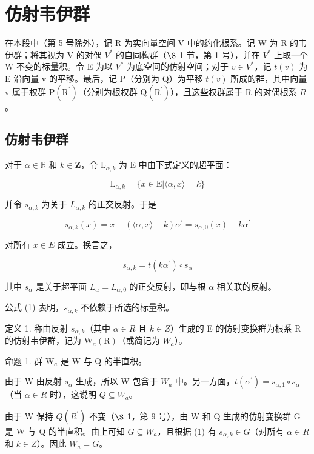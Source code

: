 \section{仿射韦伊群}

在本段中（第 5 号除外），记 R 为实向量空间 V 中的约化根系。记 W 为 R 的韦伊群；将其视为 V 的对偶 \(V^{*}\) 的自同构群（\(\S\) 1 节，第 1 号），并在 \(V^{*}\) 上取一个 W 不变的标量积。令 E 为以 \(V^{*}\) 为底空间的仿射空间；对于 \(v \in V^{*}\)，记 \(t(v)\) 为 E 沿向量 v 的平移。最后，记 P（分别为 Q）为平移 \(t(v)\) 所成的群，其中向量 v 属于权群 \(\mathrm{P}(\mathrm{R}^{\prime})\)（分别为根权群 \(\mathrm{Q}(\mathrm{R}^{\prime})\)），且这些权群属于 R 的对偶根系 \(R^{\prime}\)。

\subsection{仿射韦伊群}

对于 \(\alpha \in \mathbb{R}\) 和 \(k\in \mathbf{Z}\)，令 \(\mathrm{L}_{\alpha ,k}\) 为 E 中由下式定义的超平面：

\[
\mathrm{L} _ {\alpha , k} = \{x \in \mathrm{E} | \langle \alpha , x \rangle = k \}
\]

并令 \(s_{\alpha, k}\) 为关于 \(L_{\alpha, k}\) 的正交反射。于是

\[
s _ {\alpha , k} (x) = x - (\langle \alpha , x \rangle - k) \alpha^ {\prime} = s _ {\alpha , 0} (x) + k \alpha^ {\prime}
\]

对所有 \(x \in E\) 成立。换言之，

\[
s _ {\alpha , k} = t (k \alpha^ {\prime}) \circ s _ {\alpha}\tag{1}
\]

其中 \(s_{\alpha}\) 是关于超平面 \(L_{\alpha} = L_{\alpha,0}\) 的正交反射，即与根 \(\alpha\) 相关联的反射。

公式 (1) 表明，\(s_{\alpha, k}\) 不依赖于所选的标量积。

定义 1. 称由反射 \(s_{\alpha,k}\)（其中 \(\alpha \in R\) 且 \(k \in Z\)）生成的 E 的仿射变换群为根系 R 的仿射韦伊群，记为 \(\mathrm{W}_{a}(\mathrm{R})\)（或简记为 \(W_{a}\)）。

命题 1. 群 \(\mathrm{W}_a\) 是 \(\mathrm{W}\) 与 \(\mathrm{Q}\) 的半直积。

由于 W 由反射 \(s_{\alpha}\) 生成，所以 W 包含于 \(W_{a}\) 中。另一方面，\(t(\alpha^{\prime}) = s_{\alpha,1} \circ s_{\alpha}\)（当 \(\alpha \in R\) 时），这说明 \(Q \subseteq W_{a}\)。

由于 W 保持 \(Q(R^{\prime})\) 不变（\(\S\) 1，第 9 号），由 W 和 Q 生成的仿射变换群 G 是 W 与 Q 的半直积。由上可知 \(G \subseteq W_{a}\)，且根据 (1) 有 \(s_{\alpha,k} \in G\)（对所有 \(\alpha \in R\) 和 \(k \in Z\)）。因此 \(W_{a} = G\)。

